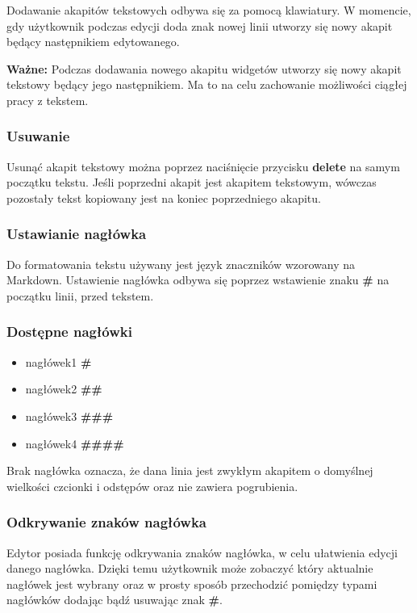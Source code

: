 Dodawanie akapitów tekstowych odbywa się za pomocą klawiatury. W momencie, gdy użytkownik podczas edycji doda znak nowej linii utworzy się nowy akapit będący następnikiem edytowanego.

\textbf{Ważne:} Podczas dodawania nowego akapitu widgetów utworzy się nowy akapit tekstowy będący jego następnikiem. Ma to na celu zachowanie możliwości ciągłej pracy z tekstem.

\subsubsection{Usuwanie}

Usunąć akapit tekstowy można poprzez naciśnięcie przycisku \textbf{delete} na samym początku tekstu. Jeśli poprzedni akapit jest akapitem tekstowym, wówczas pozostały tekst kopiowany jest na koniec poprzedniego akapitu.

\subsubsection{Ustawianie nagłówka}

Do formatowania tekstu używany jest język znaczników wzorowany na Markdown. Ustawienie nagłówka odbywa się poprzez wstawienie znaku \textbf{\#} na początku linii, przed tekstem.

\subsubsection{Dostępne nagłówki}
\begin{itemize}
    \setlength\itemsep{0mm}
    \item nagłówek1 \textbf{\#}
    \item nagłówek2 \textbf{\#\#}
    \item nagłówek3 \textbf{\#\#\#}
    \item nagłówek4 \textbf{\#\#\#\#}
\end{itemize}

Brak nagłówka oznacza, że dana linia jest zwykłym akapitem o domyślnej wielkości czcionki i odstępów oraz nie zawiera pogrubienia.

\pagebreak

\subsubsection{Odkrywanie znaków nagłówka}

Edytor posiada funkcję odkrywania znaków nagłówka, w celu ułatwienia edycji danego nagłówka. Dzięki temu użytkownik może zobaczyć który aktualnie nagłówek jest wybrany oraz w prosty sposób przechodzić pomiędzy typami nagłówków dodając bądź usuwając znak \textbf{\#}.

